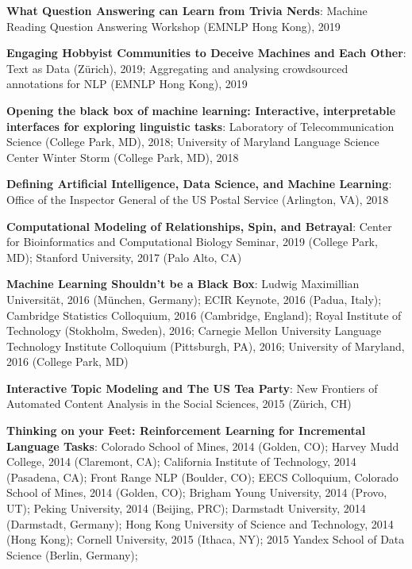 {{\begin{enumerate*}
\item {\bf What Question Answering can Learn from Trivia Nerds}:
  Machine Reading Question Answering Workshop (EMNLP Hong Kong), 2019
\item {\bf  Engaging Hobbyist
Communities to Deceive Machines and
Each Other}: Text as Data (Z\"urich), 2019; Aggregating and analysing
crowdsourced annotations for NLP (EMNLP Hong Kong), 2019
\item {\bf Opening the black box of machine learning: Interactive, interpretable interfaces for exploring linguistic tasks}: Laboratory of Telecommunication Science (College Park,
  MD), 2018;  University of Maryland Language Science Center Winter
  Storm (College Park, MD), 2018
\item {\bf Defining Artificial Intelligence, Data Science, and Machine
    Learning}: Office of the Inspector General of the US Postal
  Service (Arlington, VA), 2018
\item {\bf Computational Modeling of Relationships, Spin, and
    Betrayal}: Center for Bioinformatics and Computational Biology
  Seminar, 2019 (College Park, MD); Stanford University, 2017 (Palo
  Alto, CA)
\item {\bf Machine Learning Shouldn't be a Black Box}: Ludwig
  Maximillian Universit\"at, 2016 (M\"unchen, Germany); ECIR Keynote,
  2016 (Padua, Italy); Cambridge Statistics Colloquium, 2016
  (Cambridge, England); Royal Institute of Technology (Stokholm,
  Sweden), 2016; Carnegie Mellon University Language Technology
    Institute Colloquium (Pittsburgh, PA), 2016; University of
    Maryland, 2016 (College Park, MD)
	\item {\bf Interactive Topic Modeling and The US Tea Party}:
          New Frontiers of Automated Content Analysis in the Social
          Sciences, 2015 (Z\"urich, CH)
	\item {\bf Thinking on your Feet: Reinforcement Learning for Incremental
Language Tasks}: Colorado School of Mines, 2014 (Golden, CO); Harvey
Mudd College, 2014 (Claremont, CA); California Institute of
Technology, 2014 (Pasadena, CA); Front Range NLP (Boulder, CO); EECS
Colloquium, Colorado School of Mines, 2014 (Golden, CO); Brigham Young
University, 2014 (Provo, UT); Peking University, 2014 (Beijing, PRC);
Darmstadt University, 2014 (Darmstadt, Germany); Hong Kong University
of Science and Technology, 2014 (Hong Kong); Cornell University, 2015
(Ithaca, NY); 2015 Yandex School of Data Science (Berlin, Germany);

\end{enumerate*}}}
